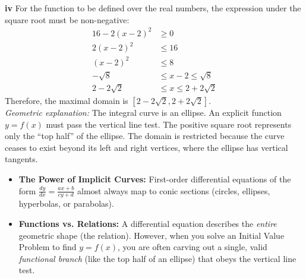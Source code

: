 \begin{solution}
\vspace{0.3cm}
\textbf{iv} For the function to be defined over the real numbers, the expression under the square root must be non-negative:
\begin{align*}
    16 - 2(x - 2)^2 &\ge 0 \\
    2(x - 2)^2 &\le 16 \\
    (x - 2)^2 &\le 8 \\
    -\sqrt{8} &\le x - 2 \le \sqrt{8} \\
    2 - 2\sqrt{2} &\le x \le 2 + 2\sqrt{2}
\end{align*}
Therefore, the maximal domain is \textbf{$[2 - 2\sqrt{2}, 2 + 2\sqrt{2}]$}. \\
\textit{Geometric explanation:} The integral curve is an ellipse. An explicit function $y=f(x)$ must pass the vertical line test. The positive square root represents only the ``top half'' of the ellipse. The domain is restricted because the curve ceases to exist beyond its left and right vertices, where the ellipse has vertical tangents.
\end{solution}

\begin{takeaways}
\begin{itemize}[leftmargin=*]
    \item \textbf{The Power of Implicit Curves:} First-order differential equations of the form $\frac{dy}{dx} = \frac{ax+b}{cy+d}$ almost always map to conic sections (circles, ellipses, hyperbolas, or parabolas).
    \item \textbf{Functions vs. Relations:} A differential equation describes the \textit{entire} geometric shape (the relation). However, when you solve an Initial Value Problem to find $y=f(x)$, you are often carving out a single, valid \textit{functional branch} (like the top half of an ellipse) that obeys the vertical line test.
\end{itemize}
\end{takeaways}

